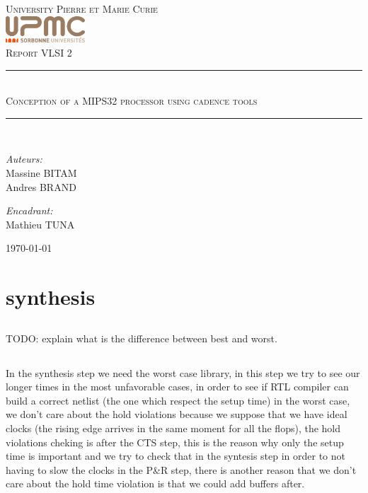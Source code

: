 \documentclass[12pt]{article}
\newcommand{\HRule}{\rule{\linewidth}{0.5mm}}
\begin{document}
\begin{titlepage}
  \begin{center}
    \textsc{\LARGE University Pierre et Marie Curie}\\[1.5cm]
    \includegraphics[height=1cm]{upmc.png}\\[1.5cm]
    \textsc{\Large Report VLSI 2 }\\[2cm]
    \HRule \\[1cm]
    \textsc{\huge Conception of a MIPS32 processor using cadence tools }\\[0.5cm]
    \HRule \\[1cm]
    \noindent
    \begin{minipage}[t]{0.55\textwidth}
      \begin{flushleft} \large
        \emph{Auteurs:}\\
        Massine \textsc{BITAM}\\
        Andres \textsc{BRAND}
      \end{flushleft}
    \end{minipage}%
    \begin{minipage}[t]{0.47\textwidth}
      \begin{flushright} \large
        \emph{Encadrant:} \\
        Mathieu \textsc{TUNA}
      \end{flushright}
    \end{minipage}
    \vfill
    {\large \today}
  \end{center}
\end{titlepage}

\section{synthesis}
\subsection*{}TODO: explain what is the difference between best and worst.
\subsection*{}In the synthesis step we need the worst case library, in this step we try to see our longer times in the most unfavorable cases, in order to see if RTL compiler can build a correct netlist (the one which respect the setup time) in the worst case, we don't care about the hold violations because we suppose that we have ideal clocks  (the rising edge arrives in the same moment for all the flops), the hold violations cheking is after the CTS step, this is the reason why only the setup time is important and we try to check that in the syntesis step in order to not having to slow the clocks in the P\&R step, there is another reason that we don't care about the hold time violation is that we could add buffers after.
\end{document}
